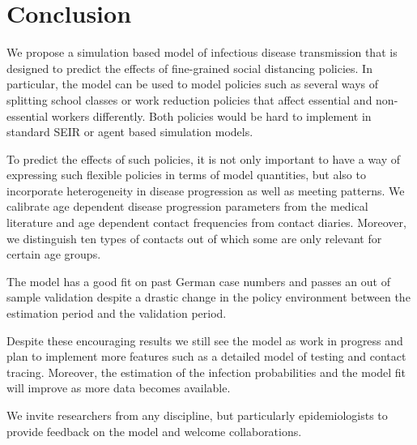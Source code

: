 \section{Conclusion}
\label{sec:conclusion}

We propose a simulation based model of infectious disease transmission that is designed to predict the effects of fine-grained social distancing policies. In particular, the model can be used to model policies such as several ways of splitting school classes or work reduction policies that affect essential and non-essential workers differently. Both policies would be hard to implement in standard SEIR or agent based simulation models.

To predict the effects of such policies, it is not only important to have a way of expressing such flexible policies in terms of model quantities, but also to incorporate heterogeneity in disease progression as well as meeting patterns. We calibrate age dependent disease progression parameters from the medical literature and age dependent contact frequencies from contact diaries. Moreover, we distinguish ten types of contacts out of which some are only relevant for certain age groups.

The model has a good fit on past German case numbers and passes an out of sample validation despite a drastic change in the policy environment between the estimation period and the validation period.

Despite these encouraging results we still see the model as work in progress and plan to implement more features such as a detailed model of testing and contact tracing. Moreover, the estimation of the infection probabilities and the model fit will improve as more data becomes available.

We invite researchers from any discipline, but particularly epidemiologists to provide feedback on the model and welcome collaborations.

